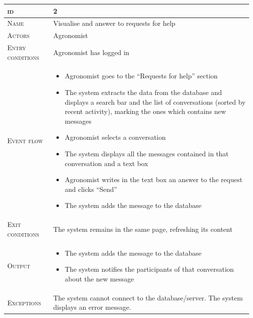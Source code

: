\begin{table}[H]
    \centering
    \begin{tabular}[c]{|l|p{}|}
        \hline %
    	\textsc{id}                 &   2\\
    	\hline %
    	\textsc{Name}               &   Visualise and answer to requests for help\\
    	\hline %
    	\textsc{Actors}             &   Agronomist\\
    	\hline %
    	\textsc{Entry conditions}   &   Agronomist has logged in\\
    	\hline %
    	\textsc{Event flow}         &   %
            	                        \begin{itemize}
                                    	    \item Agronomist goes to the “Requests for help” section
                                    		\item The system extracts the data from the database and displays a search bar and the list of conversations (sorted by recent activity), marking the ones which contains new messages
                                    		\item Agronomist selects a conversation
                                    		\item The system displays all the messages contained in that conversation and a text box
                                    		\item Agronomist writes in the text box an answer to the request and clicks “Send”
                                    		\item The system adds the message to the database
                                        \end{itemize}\\
        \hline %
        \textsc{Exit conditions}    &  The system remains in the same page, refreshing its content\\
    	\hline %
    	\textsc{Output}             &  \begin{itemize}
    	    \item The system adds the message to the database
    	    \item The system notifies the participants of that conversation about the new message
    	\end{itemize}\\
    	\hline %
    	\textsc{Exceptions}         &  The system cannot connect to the database/server. The system displays an error message.\\
    	\hline %
        

\end{tabular}
\end{table}

